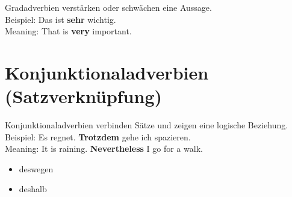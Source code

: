 \documentclass[a4paper]{article}
\begin{document}
        Gradadverbien verstärken oder schwächen eine Aussage.\\
        Beispiel: Das ist \textbf{sehr} wichtig.\\
        Meaning: That is \textbf{very} important.
    
    
    \section{Konjunktionaladverbien (Satzverknüpfung)}
        
        Konjunktionaladverbien verbinden Sätze und zeigen eine logische Beziehung.\\
        Beispiel: Es regnet. \textbf{Trotzdem} gehe ich spazieren.\\
        Meaning: It is raining. \textbf{Nevertheless} I go for a walk.
    
        \begin{itemize}
            \item deswegen
            \item deshalb
        \end{itemize}
\end{document}

